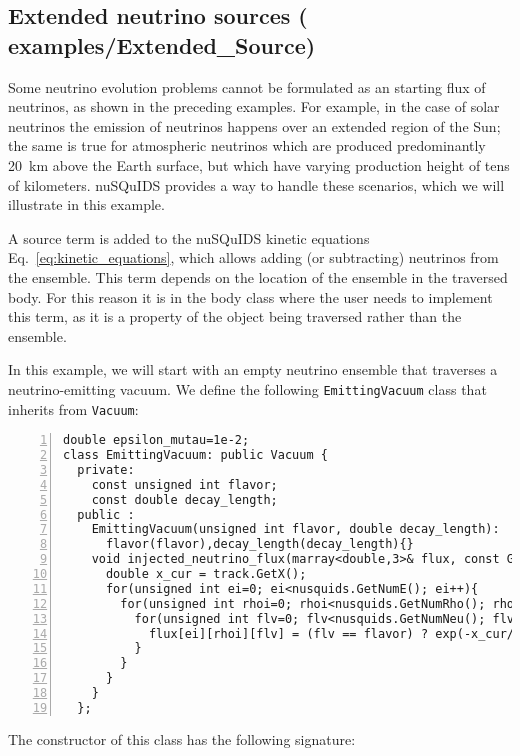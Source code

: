 \documentclass[3p,12pt]{elsarticle}
\newcommand{\ttf}{\ttfamily}
\begin{document}
\subsection{Extended neutrino sources \textnormal{({\ttf
      examples/Extended\_Source})}}
\label{sec:extended_source}

Some neutrino evolution problems cannot be formulated as an starting flux
of neutrinos, as shown in the preceding examples.
For example, in the case of solar neutrinos the emission of neutrinos happens
over an extended region of the Sun; the same is true for atmospheric neutrinos
which are produced predominantly 20~km above the Earth surface, but which have varying production
height of tens of kilometers.
{\ttf nuSQuIDS} provides a way to handle these scenarios, which we will illustrate in this example.

A source term is added to the {\ttf nuSQuIDS} kinetic equations Eq.~\eqref{eq:kinetic_equations},
which allows adding (or subtracting) neutrinos from the ensemble.
This term depends on the location of the ensemble in the traversed body.
For this reason it is in the body class where the user needs to implement this term, as it is
a property of the object being traversed rather than the ensemble.

In this example, we will start with an empty neutrino ensemble that traverses a neutrino-emitting
vacuum. We define the following \texttt{EmittingVacuum} class that inherits from \texttt{Vacuum}:

\begin{lstlisting}[frame=leftline, numbers =
  left,breaklines=true,label = ex:sin1,firstnumber=last]
  double epsilon_mutau=1e-2;
class EmittingVacuum: public Vacuum {
  private:
    const unsigned int flavor;
    const double decay_length;
  public :
    EmittingVacuum(unsigned int flavor, double decay_length):
      flavor(flavor),decay_length(decay_length){}
    void injected_neutrino_flux(marray<double,3>& flux, const GenericTrack& track, const nuSQUIDS& nusquids) override {
      double x_cur = track.GetX();
      for(unsigned int ei=0; ei<nusquids.GetNumE(); ei++){
        for(unsigned int rhoi=0; rhoi<nusquids.GetNumRho(); rhoi++){
          for(unsigned int flv=0; flv<nusquids.GetNumNeu(); flv++){
            flux[ei][rhoi][flv] = (flv == flavor) ? exp(-x_cur/decay_length) : 0.0;
          }
        }
      }
    }
  };
\end{lstlisting}

The constructor of this class has the following signature:
\end{document}

